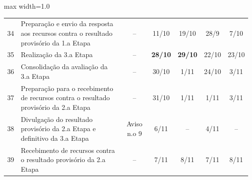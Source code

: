 \begin{quadro}[htb]
\begin{adjustbox}{max width=1.0\linewidth}
\begin{tabular}{|c|l|c|c|c|c|c|}
34 & Preparação e envio da   resposta aos recursos contra o resultado provisório da 1.a Etapa                                                   & –                   & 11/10                                                                           & 19/10                                 & 28/9                                                                            & 7/10                 \\
\rowcolor[HTML]{FCD5B4} 
35 & Realização da 3.a   Etapa                                                                                                                  & –                   & {\color[HTML]{FF0000} \textbf{28/10}}                                           & {\color[HTML]{FF0000} \textbf{29/10}} & 22/10                                                                           & 23/10                \\
36 & Consolidação da   avaliação da 3.a Etapa                                                                                                   & –                   & 30/10                                                                           & 1/11                                  & 24/10                                                                           & 3/11                 \\
37 & Preparação para o   recebimento de recursos contra o resultado provisório da 2.a Etapa                                                     & –                   & 31/10                                                                           & 1/11                                  & 1/11                                                                            & 3/11                 \\
\rowcolor[HTML]{92CDDC} 
38 & Divulgação do   resultado provisório da 2.a Etapa e definitivo da 3.a Etapa                                                                & Aviso n.o 9         & 6/11                                                                            & –                                     & 4/11                                                                            & –                    \\
39 & Recebimento de   recursos contra o resultado provisório da 2.a Etapa                                                                       & –                   & 7/11                                                                            & 8/11                                  & 7/11                                                                            & 8/11                 \\

\end{tabular}
\end{adjustbox}
\end{quadro}
